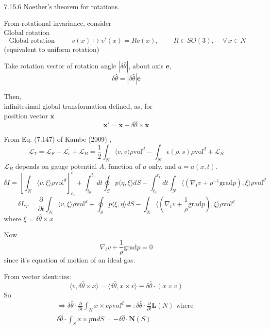 \documentclass[twoside,landscape,10pt]{amsart}
\theoremstyle{plain}
\theoremstyle{definition}
\theoremstyle{remark}
\theoremstyle{remark}
\begin{document}
\begin{multicols*}{2}
7.15.6 Noether's theorem for rotations.

From rotational invariance, consider \\
Global rotation 
\[
\text{ Global rotation } \qquad \, v(x) \mapsto v'(x) = Rv(x), \qquad \, R\in SO(3), \quad \, \forall \, x \in N
\]
(equivalent to uniform rotation)

Take rotation vector of rotation angle $|\delta \widehat{\theta}|$, about axis $\mathbf{e}$, 
\[
\delta \widehat{\theta} = | \delta \widehat{\theta} | \mathbf{e}
\]

Then,  \\
infinitesimal global transformation defined, as, for \\
\phantom{ \qquad \,  } position vector $\mathbf{x}$ 
\[
\mathbf{x}' = \mathbf{x}+ \delta \widehat{\theta} \times \mathbf{x}
\]

From Eq. (7.147) of Kambe (2009) \cite{TKambe2009}, 
\[
\mathcal{L}_T = \mathcal{L}_F + \mathcal{L}_{\epsilon} + \mathcal{L}_B = \frac{1}{2} \int_N \langle v, v\rangle \rho \text{vol}^d - \int_N \epsilon(\rho,s) \rho \text{vol}^d + \mathcal{L}_B
\]
$\mathcal{L}_B$ depends on gauge potential $A$, function of $a$ only, and $a=a(x,t)$.  
\[
\delta \underline{I} = \left[ \int_N \langle v, \xi \rangle \rho \text{vol}^d \right]_{t_0}^t + \int_{t_0}^{t_1} dt \oint_S p \langle \eta, \xi \rangle dS - \int_{t_0}^{t_1} dt \int_N \langle (\nabla_t v + \rho^{-1} \text{grad} p ), \xi \rangle \rho \text{vol}^d
\]
\[
\delta L_T = \frac{ \partial }{ \partial t} \int_N \langle v, \xi \rangle \rho \text{vol}^d + \oint_S p \langle \xi , \eta \rangle dS - \int_N \langle (\nabla_t v + \frac{1}{\rho } \text{grad}p ), \xi \rangle \rho \text{vol}^d
\]
where $\xi = \delta \widehat{\theta} \times x$

Now
\[
\nabla_t  v+ \frac{1}{\rho } \text{grad}p = 0 
\]
since it's equation of motion of an ideal gas.  

From vector identities:
\[
\langle v, \delta \widehat{\theta} \times x \rangle = \langle \delta \widehat{\theta}, x \times v \rangle \equiv \delta \widehat{\theta} \cdot (x\times v)
\]
So
\[
\begin{gathered}
  \Longrightarrow \delta \widehat{\theta} \cdot \frac{ \partial }{ \partial t} \int_N x \times v \rho \text{vol}^d =: \delta \widehat{\theta} \cdot \frac{ \partial }{ \partial t} \mathbf{L}(N) \text{ where } \\ 
   \delta \widehat{\theta} \cdot \int_S x \times p \mathbf{n} dS = - \delta \widehat{\theta} \cdot \mathbf{N}(S)
\end{gathered}
\]


\end{multicols*}
\end{document}
